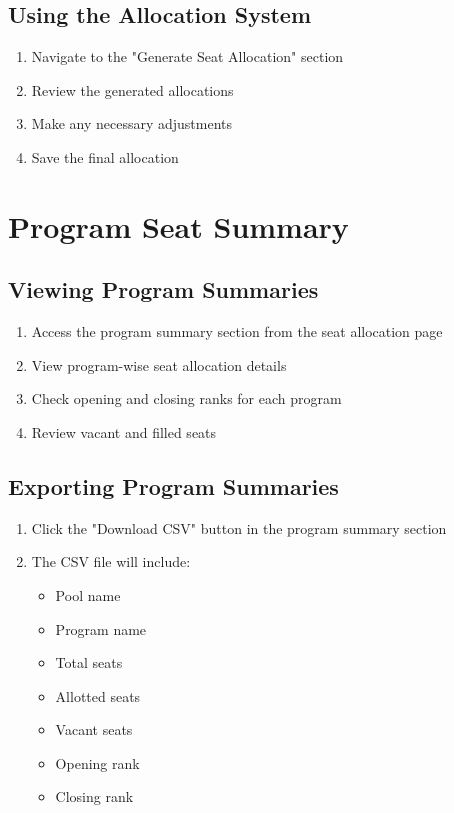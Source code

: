 \documentclass[12pt,a4paper]{article}
\begin{document}
\subsection{Using the Allocation System}
\begin{enumerate}
    \item Navigate to the "Generate Seat Allocation" section
    \item Review the generated allocations
    \item Make any necessary adjustments
    \item Save the final allocation
\end{enumerate}

\section{Program Seat Summary}
\subsection{Viewing Program Summaries}
\begin{enumerate}
    \item Access the program summary section from the seat allocation page
    \item View program-wise seat allocation details
    \item Check opening and closing ranks for each program
    \item Review vacant and filled seats
\end{enumerate}

\subsection{Exporting Program Summaries}
\begin{enumerate}
    \item Click the "Download CSV" button in the program summary section
    \item The CSV file will include:
    \begin{itemize}
        \item Pool name
        \item Program name
        \item Total seats
        \item Allotted seats
        \item Vacant seats
        \item Opening rank
        \item Closing rank
    \end{itemize}
\end{enumerate}
\end{document}

